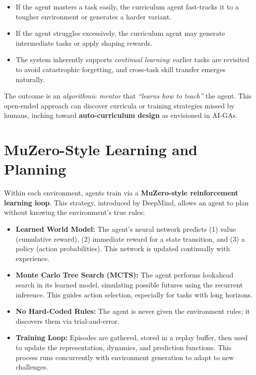 \documentclass{article}
\begin{document}
\begin{itemize}
  \item If the agent masters a task easily, the curriculum agent fast-tracks it to a tougher environment or generates a harder variant.
  \item If the agent struggles excessively, the curriculum agent may generate intermediate tasks or apply shaping rewards.
  \item The system inherently supports \emph{continual learning}: earlier tasks are revisited to avoid catastrophic forgetting, and cross-task skill transfer emerges naturally.
\end{itemize}

The outcome is an \emph{algorithmic mentor} that \emph{“learns how to teach”} the agent. This open-ended approach can discover curricula or training strategies missed by humans, inching toward \textbf{auto-curriculum design} as envisioned in AI-GAs.

\section{MuZero-Style Learning and Planning}
Within each environment, agents train via a \textbf{MuZero-style reinforcement learning loop}. This strategy, introduced by DeepMind, allows an agent to plan without knowing the environment’s true rules:

\begin{itemize}
  \item \textbf{Learned World Model:} The agent’s neural network predicts (1) value (cumulative reward), (2) immediate reward for a state transition, and (3) a policy (action probabilities). This network is updated continually with experience.
  \item \textbf{Monte Carlo Tree Search (MCTS):} The agent performs lookahead search in its learned model, simulating possible futures using the recurrent inference. This guides action selection, especially for tasks with long horizons.
  \item \textbf{No Hard-Coded Rules:} The agent is never given the environment rules; it discovers them via trial-and-error.
  \item \textbf{Training Loop:} Episodes are gathered, stored in a replay buffer, then used to update the representation, dynamics, and prediction functions. This process runs concurrently with environment generation to adapt to new challenges.
\end{itemize}
\end{document}
